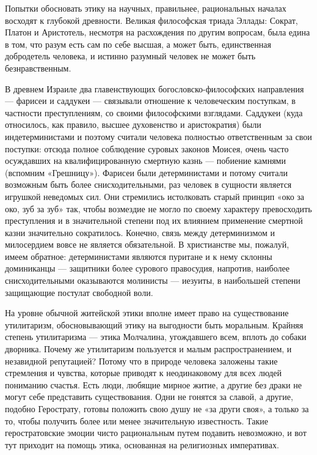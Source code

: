 Попытки обосновать этику на  научных, правильнее, рациональных началах
восходят  к глубокой  древности.  Великая  философская триада  Эллады:
Сократ,  Платон  и  Аристотель,  несмотря  на  расхождения  по  другим
вопросам, была едина в том, что разум есть сам по себе высшая, а может
быть, единственная добродетель человека, и истинно разумный человек не
может быть безнравственным.

В   древнем   Израиле   два   главенствующих   богословско-философских
направления  ---   фарисеи  и  саддукеи  ---   связывали  отношение  к
человеческим   поступкам,  в   частности   преступлениям,  со   своими
философскими  взглядами.  Саддукеи   (куда  относилось,  как  правило,
высшее  духовенство и  аристократия) были  индетерминистами и  поэтому
считали  человека полностью  ответственным  за  свои поступки:  отсюда
полное  соблюдение  суровых  законов Моисея,  очень  часто  осуждавших
на  квалифицированную смертную  казнь ---  побиение камнями  (вспомним
«Грешницу»). Фарисеи  были детерминистами  и потому  считали возможным
быть более снисходительными, раз  человек в сущности является игрушкой
неведомых сил. Они стремились истолковать  старый принцип «око за око,
зуб  за  зуб»  так,  чтобы  возмездие не  могло  по  своему  характеру
превосходить  преступления и  в значительной  степени под  их влиянием
применение  смертной  казни  значительно сократилось.  Конечно,  связь
между детерминизмом  и милосердием  вовсе не является  обязательной. В
христианстве  мы,  пожалуй,  имеем обратное:  детерминистами  являются
пуритане и  к нему  склонны доминиканцы  --- защитники  более сурового
правосудия, напротив, наиболее  снисходительными оказываются молинисты
--- иезуиты, в наибольшей степени защищающие постулат свободной воли.

На уровне обычной житейской этики  вполне имеет право на существование
утилитаризм,  обосновывающий  этику   на  выгодности  быть  моральным.
Крайняя степень  утилитаризма ---  этика Молчалина,  угождавшего всем,
вплоть до  собаки дворника. Почему  же утилитаризм пользуется  и малым
распространением,  и  незавидной  репутацией?  Потому  что  в  природе
человека  заложены  такие стремления  и  чувства,  которые приводят  к
неодинаковому  для всех  людей пониманию  счастья. Есть  люди, любящие
мирное  житие,   а  другие  без   драки  не  могут   себе  представить
существования.  Одни   не  гонятся   за  славой,  а   другие,  подобно
Герострату, готовы положить свою душу не  «за други своя», а только за
то,  чтобы получить  более или  менее значительную  известность. Такие
геростратовские эмоции  чисто рациональным путем  подавить невозможно,
и  вот  тут  приходит  на  помощь  этика,  основанная  на  религиозных
императивах.

